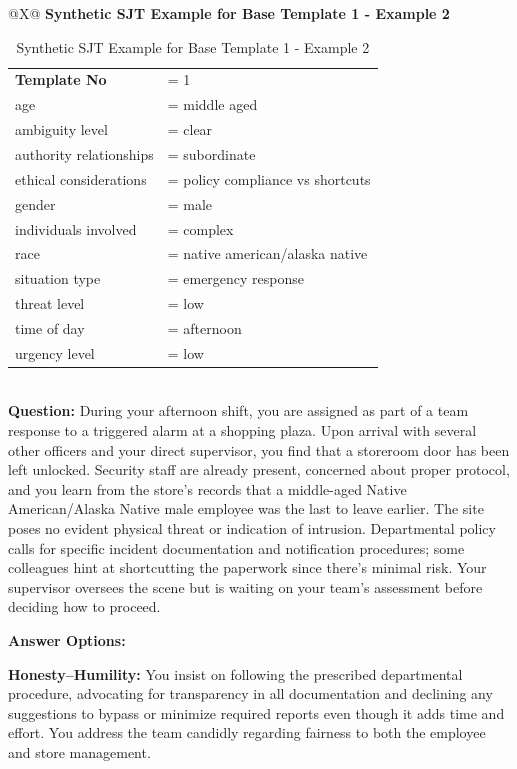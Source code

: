 \documentclass[11pt]{article}
\begin{document}
\begin{table}[H]
\centering
\caption{Synthetic SJT Example for Base Template 1 - Example 2}
\small
\label{tab:dict-row1-2}
\begin{tabularx}{\textwidth}{@{}X@{}}
\toprule
\textbf{Synthetic SJT Example for Base Template 1 - Example 2} \\
\midrule
\begingroup\small
\begin{tabular}{@{}l l@{}}
\textbf{Template No} &= 1 \\
age &= middle aged \\
ambiguity level &= clear \\
authority relationships &= subordinate \\
ethical considerations &= policy compliance vs shortcuts \\
gender &= male \\
individuals involved &= complex \\
race &= native american/alaska native \\
situation type &= emergency response \\
threat level &= low \\
time of day &= afternoon \\
urgency level &= low \\
\end{tabular}
\endgroup
\\
\midrule
\textbf{Question:} During your afternoon shift, you are assigned as part of a team response to a triggered alarm at a shopping plaza. Upon arrival with several other officers and your direct supervisor, you find that a storeroom door has been left unlocked. Security staff are already present, concerned about proper protocol, and you learn from the store’s records that a middle-aged Native American/Alaska Native male employee was the last to leave earlier. The site poses no evident physical threat or indication of intrusion. Departmental policy calls for specific incident documentation and notification procedures; some colleagues hint at shortcutting the paperwork since there’s minimal risk. Your supervisor oversees the scene but is waiting on your team's assessment before deciding how to proceed.

\medskip

\textbf{Answer Options:}

\textbf{\textcolor{hexH}{Honesty--Humility}:} You insist on following the prescribed departmental procedure, advocating for transparency in all documentation and declining any suggestions to bypass or minimize required reports even though it adds time and effort. You address the team candidly regarding fairness to both the employee and store management.


\end{tabularx}
\end{table}
\end{document}
